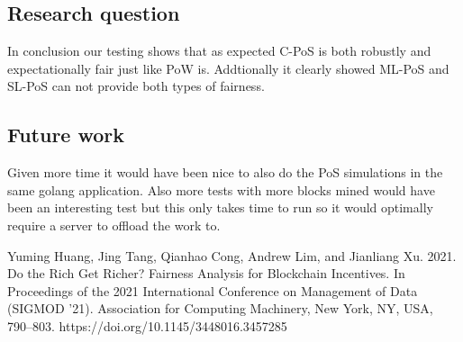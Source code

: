 \documentclass{article}
\begin{document}
\subsection{Research question}
In conclusion our testing shows that as expected \gls{C-PoS} is both robustly and expectationally fair just like \gls{PoW} is. Addtionally it clearly showed \gls{ML-PoS} and \gls{SL-PoS} can not provide both types of fairness.

\subsection{Future work}
Given more time it would have been nice to also do the \gls{PoS} simulations in the same golang application. Also more tests with more blocks mined would have been an interesting test but this only takes time to run so it would optimally require a server to offload the work to.

\begin{thebibliography}{9}
Yuming Huang, Jing Tang, Qianhao Cong, Andrew Lim, and Jianliang Xu. 2021. Do the Rich Get Richer? Fairness Analysis for Blockchain Incentives. In Proceedings of the 2021 International Conference on Management of Data (SIGMOD '21). Association for Computing Machinery, New York, NY, USA, 790–803. https://doi.org/10.1145/3448016.3457285
\end{thebibliography}
\end{document}
